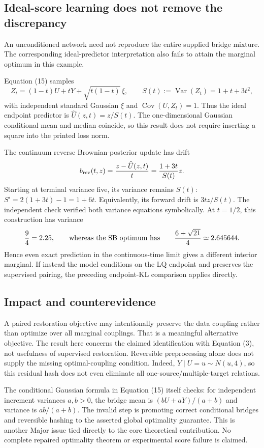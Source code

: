 \documentclass[10pt]{article}
\begin{document}
\subsection*{Ideal-score learning does not remove the discrepancy}
An unconditioned network need not reproduce the entire supplied bridge mixture. The corresponding ideal-predictor interpretation also fails to attain the marginal optimum in this example.\par
Equation (15) samples \[Z_t=(1-t)U+tY+\sqrt{t(1-t)}\,\xi,\qquad
 S(t):=\operatorname{Var}(Z_t)=1+t+3t^2,\] with independent standard Gaussian \(\xi\) and \(\operatorname{Cov}(U,Z_t)=1\). Thus the ideal endpoint predictor is \(\widehat U(z,t)=z/S(t)\). The one-dimensional Gaussian conditional mean and median coincide, so this result does not require inserting a square into the printed loss norm.\par
The continuum reverse Brownian-posterior update has drift \[b_{\rm rev}(t,z)=\frac{z-\widehat U(z,t)}t
 =\frac{1+3t}{S(t)}z.\] Starting at terminal variance five, its variance remains \(S(t)\): \(S'=2(1+3t)-1=1+6t\). Equivalently, its forward drift is \(3tz/S(t)\). The independent check verified both variance equations symbolically. At \(t=1/2\), this construction has variance \[\frac94=2.25,
 \qquad\hbox{whereas the SB optimum has}\qquad
 \frac{6+\sqrt{21}}4\simeq2.645644.\] Hence even exact prediction in the continuous-time limit gives a different interior marginal. If instead the model conditions on the LQ endpoint and preserves the supervised pairing, the preceding endpoint-KL comparison applies directly.\par
\subsection*{Impact and counterevidence}
A paired restoration objective may intentionally preserve the data coupling rather than optimize over all marginal couplings. That is a meaningful alternative objective. The result here concerns the claimed identification with Equation (3), not usefulness of supervised restoration. Reversible preprocessing alone does not supply the missing optimal-coupling condition. Indeed, \(Y\mid U=u\sim N(u,4)\), so this residual hash does not even eliminate all one-source/multiple-target relations.\par
The conditional Gaussian formula in Equation (15) itself checks: for independent increment variances \(a,b>0\), the bridge mean is \((bU+aY)/(a+b)\) and variance is \(ab/(a+b)\). The invalid step is promoting correct conditional bridges and reversible hashing to the asserted global optimality guarantee. This is another Major issue tied directly to the core theoretical contribution. No complete repaired optimality theorem or experimental score failure is claimed.\par
\end{document}
